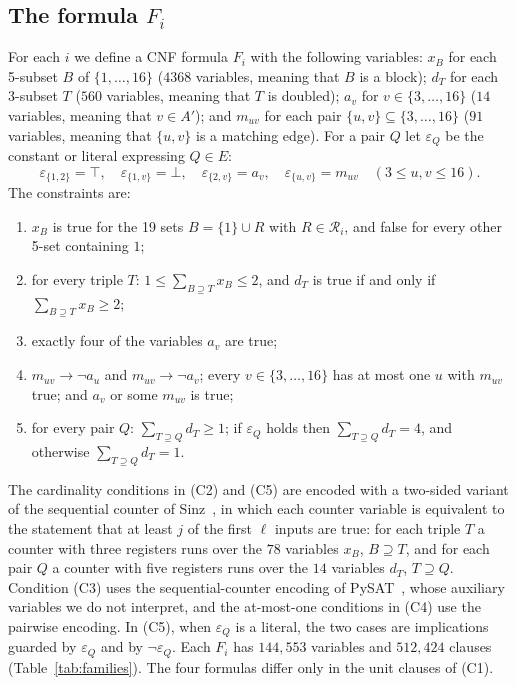 \documentclass[11pt]{amsart}
\theoremstyle{definition}
\theoremstyle{remark}
\newcommand{\cR}{\mathcal{R}}
\begin{document}
\subsection*{The formula \texorpdfstring{$F_i$}{F\_i}}
For each $i$ we define a CNF formula $F_i$ with the following variables:
$x_B$ for each 5-subset $B$ of $\{1,\dots,16\}$ ($4368$ variables, meaning
that $B$ is a block); $d_T$ for each 3-subset $T$ ($560$ variables, meaning
that $T$ is doubled); $a_v$ for $v\in\{3,\dots,16\}$ ($14$ variables, meaning
that $v\in A'$); and $m_{uv}$ for each pair $\{u,v\}\subseteq\{3,\dots,16\}$
($91$ variables, meaning that $\{u,v\}$ is a matching edge). For a pair $Q$
let $\varepsilon_Q$ be the constant or literal expressing $Q\in E$:
\[
\varepsilon_{\{1,2\}}=\top,\quad \varepsilon_{\{1,v\}}=\bot,\quad
\varepsilon_{\{2,v\}}=a_v,\quad \varepsilon_{\{u,v\}}=m_{uv}
\quad (3\le u,v\le 16).
\]
The constraints are:
\begin{enumerate}
\item[(C1)] $x_B$ is true for the 19 sets $B=\{1\}\cup R$ with $R\in\cR_i$,
and false for every other 5-set containing $1$;
\item[(C2)] for every triple $T$: $1\le\sum_{B\supseteq T}x_B\le 2$, and $d_T$
is true if and only if $\sum_{B\supseteq T}x_B\ge 2$;
\item[(C3)] exactly four of the variables $a_v$ are true;
\item[(C4)] $m_{uv}\to\neg a_u$ and $m_{uv}\to\neg a_v$; every
$v\in\{3,\dots,16\}$ has at most one $u$ with $m_{uv}$ true; and $a_v$ or
some $m_{uv}$ is true;
\item[(C5)] for every pair $Q$: $\sum_{T\supseteq Q}d_T\ge 1$; if
$\varepsilon_Q$ holds then $\sum_{T\supseteq Q}d_T=4$, and otherwise
$\sum_{T\supseteq Q}d_T=1$.
\end{enumerate}
The cardinality conditions in (C2) and (C5) are encoded with a two-sided
variant of the sequential counter of Sinz~\cite{sinz2005}, in which each
counter variable is equivalent to the statement that at least $j$ of the
first $\ell$ inputs are true: for each triple $T$ a counter with three
registers runs over the $78$ variables $x_B$, $B\supseteq T$, and for each
pair $Q$ a counter with five registers runs over the $14$ variables $d_T$,
$T\supseteq Q$. Condition (C3) uses the sequential-counter encoding of
PySAT~\cite{ignatiev2018}, whose auxiliary variables we do not interpret, and
the at-most-one conditions in (C4) use the pairwise encoding. In (C5), when
$\varepsilon_Q$ is a literal, the two cases are implications guarded by
$\varepsilon_Q$ and by $\neg\varepsilon_Q$. Each $F_i$ has $144{,}553$
variables and $512{,}424$ clauses (Table~\ref{tab:families}). The four
formulas differ only in the unit clauses of (C1).
\end{document}
